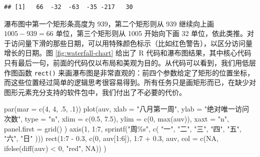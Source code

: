 \documentclass[
  b5paper,
  UTF8,twoside]{book}
\newenvironment{Shaded}{\begin{snugshade}}{\end{snugshade}}
\newcommand{\AttributeTok}[1]{\textcolor[rgb]{0.77,0.63,0.00}{#1}}
\newcommand{\ConstantTok}[1]{\textcolor[rgb]{0.00,0.00,0.00}{#1}}
\newcommand{\DecValTok}[1]{\textcolor[rgb]{0.00,0.00,0.81}{#1}}
\newcommand{\FloatTok}[1]{\textcolor[rgb]{0.00,0.00,0.81}{#1}}
\newcommand{\FunctionTok}[1]{\textcolor[rgb]{0.00,0.00,0.00}{#1}}
\newcommand{\NormalTok}[1]{#1}
\newcommand{\SpecialCharTok}[1]{\textcolor[rgb]{0.00,0.00,0.00}{#1}}
\newcommand{\StringTok}[1]{\textcolor[rgb]{0.31,0.60,0.02}{#1}}
\begin{document}
\begin{verbatim}
## [1]   66  -32  -63  -35 -217   30
\end{verbatim}

瀑布图中第一个矩形条高度为 939，第二个矩形则从 939 继续向上画 \(1005-939=66\) 单位，第三个矩形则从 1005 开始向下画 32 单位，依此类推。对于访问量下滑的那些日期，可以用特殊颜色标示（比如红色警告），以区分访问量增长的日期。图 \ref{fig:waterfall-chart} 给出了 R 代码和瀑布图结果，其中核心代码只有最后一句，前面的代码仅以布局和美观为目的。从代码可以看到，我们用低层作图函数 \texttt{rect()} 来画瀑布图是非常直观的：前四个参数给定了矩形的位置坐标，而这些位置经过简单的逻辑思考很容易得到。所有任务只是画矩形而已，在缺少对图形元素充分支持的软件包中，我们付出了不必要的代价。

\begin{Shaded}
\begin{Highlighting}[]
\FunctionTok{par}\NormalTok{(}\AttributeTok{mar =} \FunctionTok{c}\NormalTok{(}\DecValTok{4}\NormalTok{, }\DecValTok{4}\NormalTok{, .}\DecValTok{5}\NormalTok{, .}\DecValTok{1}\NormalTok{))}
\FunctionTok{plot}\NormalTok{(auv,}
  \AttributeTok{xlab =} \StringTok{"八月第一周"}\NormalTok{,}
  \AttributeTok{ylab =} \StringTok{"绝对唯一访问次数"}\NormalTok{, }\AttributeTok{type =} \StringTok{"n"}\NormalTok{,}
  \AttributeTok{xlim =} \FunctionTok{c}\NormalTok{(}\FloatTok{0.5}\NormalTok{, }\FloatTok{7.5}\NormalTok{),}
  \AttributeTok{ylim =} \FunctionTok{c}\NormalTok{(}\DecValTok{0}\NormalTok{, }\FunctionTok{max}\NormalTok{(auv)),}
  \AttributeTok{xaxt =} \StringTok{"n"}\NormalTok{, }\AttributeTok{panel.first =} \FunctionTok{grid}\NormalTok{()}
\NormalTok{)}
\FunctionTok{axis}\NormalTok{(}\DecValTok{1}\NormalTok{, }\DecValTok{1}\SpecialCharTok{:}\DecValTok{7}\NormalTok{, }\FunctionTok{sprintf}\NormalTok{(}\StringTok{"周\%s"}\NormalTok{, }\FunctionTok{c}\NormalTok{(}
  \StringTok{"一"}\NormalTok{, }\StringTok{"二"}\NormalTok{, }\StringTok{"三"}\NormalTok{, }\StringTok{"四"}\NormalTok{, }\StringTok{"五"}\NormalTok{, }\StringTok{"六"}\NormalTok{, }\StringTok{"日"}
\NormalTok{)))}
\FunctionTok{rect}\NormalTok{(}\DecValTok{1}\SpecialCharTok{:}\DecValTok{7} \SpecialCharTok{{-}} \FloatTok{0.3}\NormalTok{, }\FunctionTok{c}\NormalTok{(}\DecValTok{0}\NormalTok{, auv[}\DecValTok{1}\SpecialCharTok{:}\DecValTok{6}\NormalTok{]), }\DecValTok{1}\SpecialCharTok{:}\DecValTok{7} \SpecialCharTok{+} \FloatTok{0.3}\NormalTok{, auv,}
  \AttributeTok{col =} \FunctionTok{c}\NormalTok{(}\ConstantTok{NA}\NormalTok{, }\FunctionTok{ifelse}\NormalTok{(}\FunctionTok{diff}\NormalTok{(auv) }\SpecialCharTok{\textless{}} \DecValTok{0}\NormalTok{, }\StringTok{"red"}\NormalTok{, }\ConstantTok{NA}\NormalTok{))}
\NormalTok{)}
\end{Highlighting}
\end{Shaded}
\end{document}
